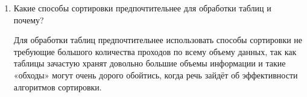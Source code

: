 \begin{enumerate}
	\item Какие способы сортировки предпочтительнее для обработки таблиц и почему?
	
	Для  обработки  таблиц  предпочтительнее  использовать  способы сортировки не требующие большого количества проходов по всему объему данных,  так  как  таблицы  зачастую  хранят  довольно  большие  объемы информации и такие «обходы» могут очень дорого обойтись, когда речь зайдёт об эффективности алгоритмов сортировки.
\end{enumerate}

